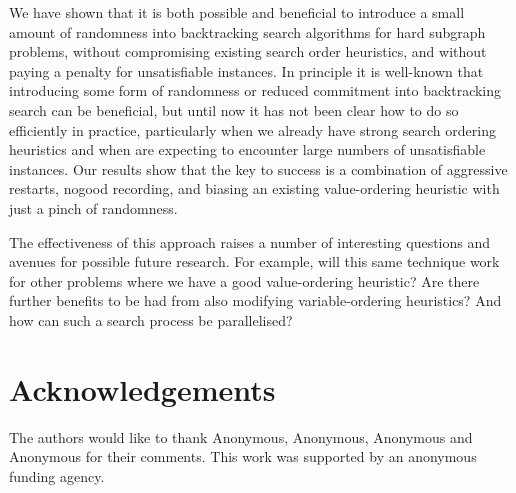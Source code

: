 \documentclass[letterpaper]{article} %
\begin{document}
We have shown that it is both possible and beneficial to introduce a small amount of randomness into
backtracking search algorithms for hard subgraph problems, without compromising existing search
order heuristics, and without paying a penalty for unsatisfiable instances. In principle it is
well-known that introducing some form of randomness \cite{DBLP:conf/aaai/GomesSK98} or reduced
commitment \cite{DBLP:conf/ijcai/HarveyG95} into backtracking search can be beneficial, but until
now it has not been clear how to do so efficiently in practice, particularly when we already have
strong search ordering heuristics and when are expecting to encounter large numbers of unsatisfiable
instances. Our results show that the key to success is a combination of aggressive restarts, nogood
recording, and biasing an existing value-ordering heuristic with just a pinch of randomness.

The effectiveness of this approach raises a number of interesting questions and avenues for possible
future research. For example, will this same technique work for other problems where we have a good
value-ordering heuristic? Are there further benefits to be had from also modifying variable-ordering
heuristics? And how can such a search process be parallelised?

\section*{Acknowledgements}


The authors would like to thank Anonymous, Anonymous, Anonymous and Anonymous for their comments.
This work was supported by an anonymous funding agency.



\end{document}
